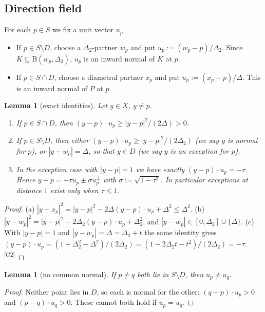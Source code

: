 \documentclass[11pt]{amsart}
\newtheorem{lemma}[theorem]{Lemma}
\theoremstyle{definition}
\theoremstyle{remark}
\newcommand{\Dt}{\Delta_2}
\newcommand{\Dd}{\mathrm{B}}      %
\newcommand{\chk}[1]{\textsuperscript{[#1]}}
\begin{document}
\subsection*{Direction field}
For each $p\in S$ we fix a unit vector $u_p$.
\begin{itemize}[leftmargin=2em]
\item If $p\in S\setminus D$, choose a $\Dt$-partner $w_p$ and put $u_p:=(w_p-p)/\Dt$. Since $K\subseteq\Dd(w_p,\Dt)$, $u_p$ is an inward normal of $K$ at $p$.
\item If $p\in S\cap D$, choose a diametral partner $x_p$ and put $u_p:=(x_p-p)/\Delta$. This is an inward normal of $P$ at $p$.
\end{itemize}

\begin{lemma}[exact identities]\label{lem:identities}
Let $y\in X$, $y\neq p$.
\begin{enumerate}[label=(\alph*)]
\item If $p\in S\cap D$, then $(y-p)\cdot u_p\ge |y-p|^2/(2\Delta)>0$.
\item If $p\in S\setminus D$, then either $(y-p)\cdot u_p\ge |y-p|^2/(2\Dt)$ (we say $y$ is \emph{normal} for $p$), or $|y-w_p|=\Delta$, so that $y\in D$ (we say $y$ is an \emph{exception} for $p$).
\item In the exception case with $|y-p|=1$ we have exactly $(y-p)\cdot u_p=-\tau$. Hence $y-p=-\tau u_p\pm\sigma u_p^{\perp}$ with $\sigma:=\sqrt{1-\tau^2}$. In particular exceptions at distance $1$ exist only when $\tau\le 1$.
\end{enumerate}
\end{lemma}
\begin{proof}
(a) $|y-x_p|^2=|y-p|^2-2\Delta(y-p)\cdot u_p+\Delta^2\le\Delta^2$. (b) $|y-w_p|^2=|y-p|^2-2\Dt(y-p)\cdot u_p+\Dt^2$, and $|y-w_p|\in[0,\Dt]\cup\{\Delta\}$. (c) With $|y-p|=1$ and $|y-w_p|=\Delta=\Dt+t$ the same identity gives $(y-p)\cdot u_p=(1+\Dt^2-\Delta^2)/(2\Dt)=(1-2\Dt t-t^2)/(2\Dt)=-\tau$.\chk{C2}
\end{proof}

\begin{lemma}[no common normal]\label{lem:nocommon}
If $p\neq q$ both lie in $S\setminus D$, then $u_p\neq u_q$.
\end{lemma}
\begin{proof}
Neither point lies in $D$, so each is normal for the other: $(q-p)\cdot u_p>0$ and $(p-q)\cdot u_q>0$. These cannot both hold if $u_p=u_q$.
\end{proof}
\end{document}
